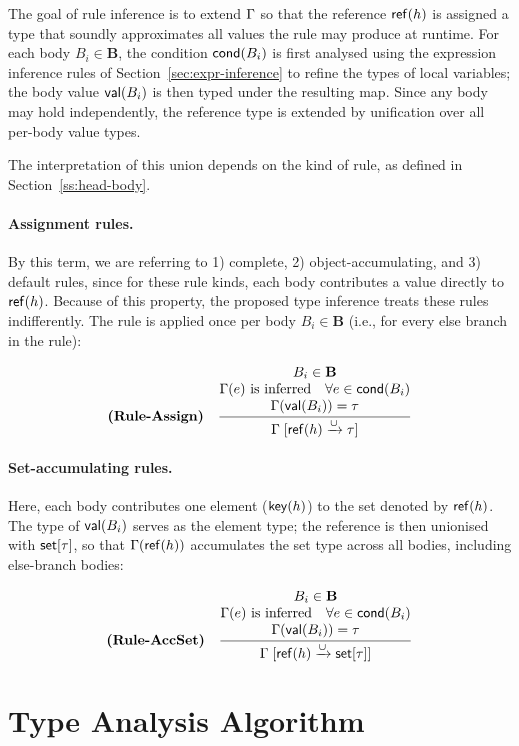 The goal of rule inference is to extend $\Gamma$ so that the reference $\mathsf{ref}(h)$ is assigned a type that soundly approximates all values the rule may produce at runtime.
For each body $B_i \in \mathbf{B}$, the condition $\mathsf{cond}(B_i)$ is first analysed using the expression inference rules of Section~\ref{sec:expr-inference} to refine the types of local variables; the body value $\mathsf{val}(B_i)$ is then typed under the resulting map.
Since any body may hold independently, the reference type is extended by unification over all per-body value types.

The interpretation of this union depends on the kind of rule, as defined in Section~\ref{ss:head-body}.

\paragraph{Assignment rules.}
By this term, we are referring to 1) complete, 2) object-accumulating, and 3) default rules, since for these rule kinds, each body contributes a value directly to $\mathsf{ref}(h)$.
Because of this property, the proposed type inference treats these rules indifferently.
The rule is applied once per body $B_i \in \mathbf{B}$ (i.e., for every else branch in the rule):

\[
\textbf{(Rule-Assign)}\quad
\inferrule{
  B_i \in \mathbf{B} \\
  \typof(e) \text{ is inferred} \quad \forall e \in \BodyCond(B_i) \\
  \typof(\BodyVal(B_i)) = \ty
}{
  \unionize{\RuleRef(h)}{\ty}
}
\]

\paragraph{Set-accumulating rules.}
Here, each body contributes one element ($\mathsf{key}(h)$) to the set denoted by $\mathsf{ref}(h)$.
The type of $\mathsf{val}(B_i)$ serves as the element type; the reference is then unionised with $\mathsf{set}[{\tau}]$, so that $\Gamma(\mathsf{ref}(h))$ accumulates the set type across all bodies, including else-branch bodies:

\[
\textbf{(Rule-AccSet)}\quad
\inferrule{
  B_i \in \mathbf{B} \\
  \typof(e) \text{ is inferred} \quad \forall e \in \BodyCond(B_i) \\
  \typof(\BodyVal(B_i)) = \tau
}{
  \unionize{\RuleRef(h)}{\RegoSet{\tau}}
}
\]

\section{Type Analysis Algorithm}
\label{sec:analysis-algorithm}

